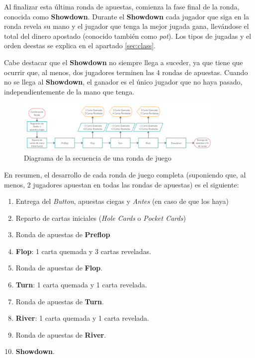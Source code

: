 Al finalizar esta última ronda de apuestas, comienza la fase final de la ronda, conocida como \textbf{Showdown}. Durante el  \textbf{Showdown} cada jugador que siga en la ronda revela su mano y el jugador que tenga la mejor jugada gana, llevándose el total del dinero apostado (conocido también como \textit{pot}). Los tipos de jugadas y el orden deestas se explica en el apartado \ref{sec:class}.

Cabe destacar que el \textbf{Showdown} no siempre llega a suceder, ya que tiene que ocurrir que, al menos, dos jugadores terminen las  4 rondas de apuestas. Cuando no se llega al \textbf{Showdown}, el ganador es el único jugador que no haya pasado, independientemente de la mano que tenga.

\begin{figure}[h]
\centering
\includegraphics[width=0.9\textwidth]{figuras/Grafo3.png}   
\caption{Diagrama de la secuencia de una ronda de juego \cite{propiaCreately}}
\label{fig:bids}
\end{figure}

En resumen, el desarrollo de cada ronda de juego completa (suponiendo que, al menos, 2 jugadores apuestan en todas las rondas de apuestas) es el siguiente:
\begin{enumerate}
\item Entrega del \textit{Button}, apuestas ciegas y \textit{Antes} (en caso de que los haya)
\item Reparto de cartas iniciales (\textit{Hole Cards} o \textit{Pocket Cards})
\item Ronda de apuestas de \textbf{Preflop}
\item \textbf{Flop}: 1 carta quemada y 3 cartas reveladas.
\item Ronda de apuestas de \textbf{Flop}.
\item \textbf{Turn}: 1 carta quemada y 1 carta revelada.
\item Ronda de apuestas de \textbf{Turn}.
\item \textbf{River}: 1 carta quemada y 1 carta revelada.
\item Ronda de apuestas de \textbf{River}.
\item \textbf{Showdown}.
\end{enumerate}
 


